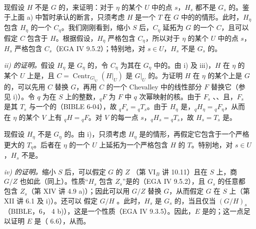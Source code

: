 现假设 $H$ 不是 $G$ 的，来证明：对于 $\eta$ 的某个 $U$ 中的点 $s$，$H_s$ 都不是 $G_s$ 的。鉴于上面 a) 中暂时承认的断言，只须考虑 $H$ 是一个 $T$ 在 $G$ 中的的情形。此时，$H_\eta$ 包含 $H_\eta$ 的一个 $C_\eta$。我们刚刚看到，缩小 $S$ 后，$C_\eta$ 延拓为 $G$ 的一个 $C$，且可以假定 $C$ 包含于 $H$。根据假设，$H_\eta$ 严格包含 $C_\eta$，所以对于 $\eta$ 的某个 $U$ 中的点 $s$，$H_s$ 严格包含 $C_s$（EGA IV 9.5.2）；特别地，对 $s\in U$，$H_s$ 不是 $G_s$ 的。

\emph{ii) 的证明。}假设 $H_\eta$ 是 $G_\eta$ 的，令 $C_\eta$ 为其在 $G_\eta$ 中的。由 i) 及 iii)，$H$ 在 $\eta$ 的某个 $U$ 上是，且 $C=\operatorname{Centr}_{G|_U}(H|_U)$ 是 $G|_U$ 的。为证明 $H$ 在 $\eta$ 的某个上是 $G$ 的，可以先用 $C$ 替换 $G$，再用 $C$ 的一个 Chevalley 中的线性部分 $F$ 替换它（参见 i)）。令 $q$ 为在 $S$ 上的整数，${}_qF$ 为 $F$ 中 $q$ 次幂映射的核。由于 $F_s$ 、、且，$F_s$ 是其 $T_s$ 与一个的（BIBLE 6-04），故 ${}_qF_s={}_qT_s$。由于 $H_\eta$ 是，${}_qH_\eta={}_qF_\eta$，从而在 $\eta$ 的某个 $V$ 上有 ${}_qH={}_qF$。对 $V$ 的每一点 $s$，${}_qH_s={}_qT_s$，故 $H_s=T_s$ 是。

现假设 $H_\eta$ 不是 $G_\eta$ 的。由 i)，只须考虑 $H_\eta$ 是的情形，再假定它包含于一个严格更大的 $T_\eta$。后者在 $\eta$ 的一个 $U$ 上延拓为一个严格包含 $H$ 的 $T$。特别地，对 $s\in U$，$H_s$ 不是。

\emph{iv) 的证明。}缩小 $S$ 后，可以假定 $G$ 的 $Z$ （第 VI$_B$ 讲 10.11）且在 $S$ 上，商 $G/Z$ 也如此（同上）。性质“$H_s$ 包含 $Z_s$”是的（EGA IV 9.5.2），且 $G_s$ 的任意都包含 $Z_s$（第 XIV 讲 4.9 a)）；因此可以用 $G/Z$ 替换 $G$，从而假定 $G$ 在 $S$ 上（第 XII 讲 6.1 及 i)）。还可以
假定 $G/H$ 。此时，$H_s$ 是 $G_s$ 的，当且仅当 $(G/H)_s$ （BIBLE，6， 4 b)），这是一个性质（EGA IV 9.3.5）。因此，$E$ 是的；这一点足以证明 $E$ 是（ 6.6），从而。

